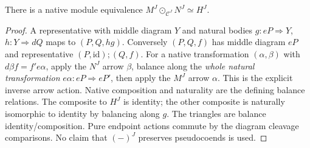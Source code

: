 \documentclass[11pt]{article}
\begin{document}
\begin{lemma}
There is a native module equivalence $M^J\odot_{\mathcal C^J}N^J\simeq H^J$.
\end{lemma}
\begin{proof}
A representative with middle diagram $Y$ and natural bodies $g:eP\Rightarrow Y$, $h:Y\Rightarrow dQ$ maps to $(P,Q,hg)$. Conversely $(P,Q,f)$ has middle diagram $eP$ and representative $(P,\mathrm{id});(Q,f)$. For a native transformation $(\alpha,\beta)$ with $d\beta f=f'e\alpha$, apply the $N^J$ arrow $\beta$, balance along the \emph{whole natural transformation} $e\alpha:eP\Rightarrow eP'$, then apply the $M^J$ arrow $\alpha$. This is the explicit inverse arrow action. Native composition and naturality are the defining balance relations. The composite to $H^J$ is identity; the other composite is naturally isomorphic to identity by balancing along $g$. The triangles are balance identity/composition. Pure endpoint actions commute by the diagram cleavage comparisons. No claim that $(-)^J$ preserves pseudocoends is used.
\end{proof}
\end{document}
